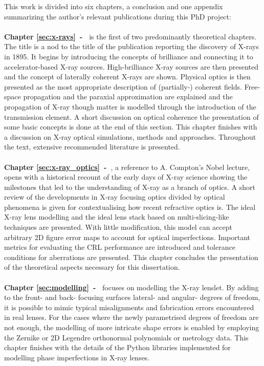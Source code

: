 This work is divided into six chapters, a conclusion and one appendix summarizing the author's relevant publications during this PhD project:
\\
\\
\textbf{Chapter \ref{sec:x-rays}~-~} is the first of two predominantly theoretical chapters. The title is a nod to the title of the publication reporting the discovery of X-rays in 1895. It begins by introducing the concepts of brilliance and connecting it to accelerator-based X-ray sources. High-brilliance X-ray sources are then presented and the concept of laterally coherent X-rays are shown. Physical optics is then presented as the most appropriate description of (partially-) coherent fields. Free-space propagation and the paraxial approximation are explained and the propagation of X-ray though matter is modelled through the introduction of the transmission element. A short discussion on optical coherence the presentation of some basic concepts is done at the end of this section. This chapter finishes with a discussion on X-ray optical simulations, methods and approaches. Throughout the text, extensive recommended literature is presented.
\\
\\
\textbf{Chapter \ref{sec:x-ray_optics}~-~}, a reference to A. Compton's Nobel lecture, opens with a historical recount of the early days of X-ray science showing the milestones that led to the understanding of X-ray as a branch of optics. A short review of the developments in X-ray focusing optics divided by optical phenomena is given for contextualising how recent refractive optics is. The ideal X-ray lens modelling and the ideal lens stack based on multi-slicing-like techniques are presented. With little modification, this model can accept arbitrary 2D figure error maps to account for optical imperfections. Important metrics for evaluating the CRL performance are introduced and tolerance conditions for aberrations are presented. This chapter concludes the presentation of the theoretical aspects necessary for this dissertation.
\\
\\
\textbf{Chapter \ref{sec:modelling}~-~} focuses on modelling the X-ray lenslet. By adding to the front- and back- focusing surfaces lateral- and angular- degrees of freedom, it is possible to mimic typical misalignments and fabrication errors encountered in real lenses. For the cases where the newly parametrised degrees of freedom are not enough, the modelling of more intricate shape errors is enabled by employing the Zernike or 2D Legendre orthonormal polynomials or metrology data. This chapter finishes with the details of the Python libraries implemented for modelling phase imperfections in X-ray lenses.
